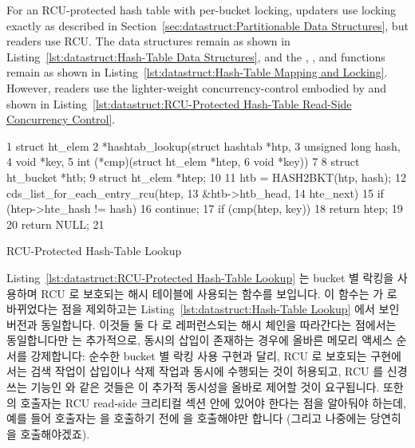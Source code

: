 For an RCU-protected hash table with per-bucket locking,
updaters use locking exactly as described in
Section~\ref{sec:datastruct:Partitionable Data Structures},
but readers use RCU.
The data structures remain as shown in
Listing~\ref{lst:datastruct:Hash-Table Data Structures},
and the , , and 
functions remain as shown in
Listing~\ref{lst:datastruct:Hash-Table Mapping and Locking}.
However, readers use the lighter-weight concurrency-control embodied
by  and 
shown in
Listing~\ref{lst:datastruct:RCU-Protected Hash-Table Read-Side Concurrency Control}.
\fi

\begin{listing}[tb]
{ \scriptsize
\begin{verbbox}
 1 struct ht_elem
 2 *hashtab_lookup(struct hashtab *htp,
 3                 unsigned long hash,
 4                 void *key,
 5                 int (*cmp)(struct ht_elem *htep,
 6                            void *key))
 7 {
 8   struct ht_bucket *htb;
 9   struct ht_elem *htep;
10 
11   htb = HASH2BKT(htp, hash);
12   cds_list_for_each_entry_rcu(htep,
13                               &htb->htb_head,
14                               hte_next) {
15     if (htep->hte_hash != hash)
16       continue;
17     if (cmp(htep, key))
18       return htep;
19   }
20   return NULL;
21 }
\end{verbbox}
}
\centering
\theverbbox
\caption{RCU-Protected Hash-Table Lookup}
\label{lst:datastruct:RCU-Protected Hash-Table Lookup}
\end{listing}

Listing~\ref{lst:datastruct:RCU-Protected Hash-Table Lookup} 는 bucket 별 락킹을
사용하며 RCU 로 보호되는 해시 테이블에 사용되는  함수를
보입니다.
이 함수는  가 
로 바뀌었다는 점을 제외하고는
Listing~\ref{lst:datastruct:Hash-Table Lookup} 에서 보인 버전과 동일합니다.
이것들 둘 다  로 레퍼런스되는 해시 체인을 따라간다는 점에서는
동일합니다만  는 추가적으로, 동시의 삽입이
존재하는 경우에 올바른 메모리 액세스 순서를 강제합니다:
순수한 bucket 별 락킹 사용 구현과 달리, RCU 로 보호되는 구현에서는 검색 작업이
삽입이나 삭제 작업과 동시에 수행되는 것이 허용되고, RCU 를 신경쓰는 기능인
 와 같은 것들은 이 추가적 동시성을 올바로
제어할 것이 요구됩니다.
또한  의 호출자는 RCU read-side 크리티컬 섹션 안에 있어야
한다는 점을 알아둬야 하는데, 예를 들어 호출자는  을
호출하기 전에  을 호출해야만 합니다 (그리고 나중에는
당연히  을 호출해야겠죠).
\iffalse


